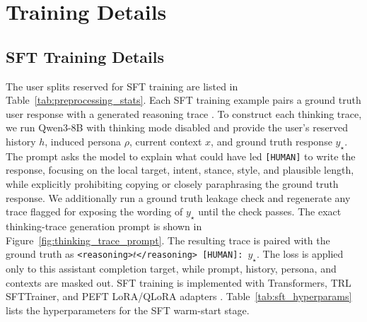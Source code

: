 \documentclass{article} %
\begin{document}
\section{Training Details}
\label{app:training_details}
\subsection{SFT Training Details}
\label{app:sft_training_details}
\label{app:thinking-trace-prompt}
\label{app:hyperparams}

The user splits reserved for SFT training are listed in Table~\ref{tab:preprocessing_stats}. Each SFT training example pairs a ground truth user response with a generated reasoning trace \citep{lu2026llmagentssimulatemultiturn}. To construct each thinking trace, we run Qwen3-8B with thinking mode disabled and provide the user's reserved history $h$, induced persona $\rho$, current context $x$, and ground truth response $y_{\star}$. The prompt asks the model to explain what could have led \texttt{[HUMAN]} to write the response, focusing on the local target, intent, stance, style, and plausible length, while explicitly prohibiting copying or closely paraphrasing the ground truth response. We additionally run a ground truth leakage check and regenerate any trace flagged for exposing the wording of $y_{\star}$ until the check passes. The exact thinking-trace generation prompt is shown in Figure~\ref{fig:thinking_trace_prompt}. The resulting trace is paired with the ground truth as \texttt{<reasoning>}$t$\texttt{</reasoning> [HUMAN]:}~$y_{\star}$. The loss is applied only to this assistant completion target, while prompt, history, persona, and contexts are masked out. SFT training is implemented with Transformers, TRL SFTTrainer, and PEFT LoRA/QLoRA adapters \citep{transformers, TRL, peft}. Table~\ref{tab:sft_hyperparams} lists the hyperparameters for the SFT warm-start stage.


\end{document}
